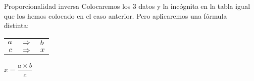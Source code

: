 \begin{infocard}{Proporcionalidad inversa}
    Colocaremos los 3 datos y la incógnita en la tabla igual que los hemos
    colocado en el caso anterior. Pero aplicaremos una fórmula distinta:
    \begin{center}
        \begin{tabular}{r>{\centering}p{0.2cm}l}
            $a$ & $\Rightarrow$ & $b$ \\
            $c$ & $\Rightarrow$ & $x$
        \end{tabular}\quad$x=\dfrac{a \times b}{c}$
    \end{center}
\end{infocard}